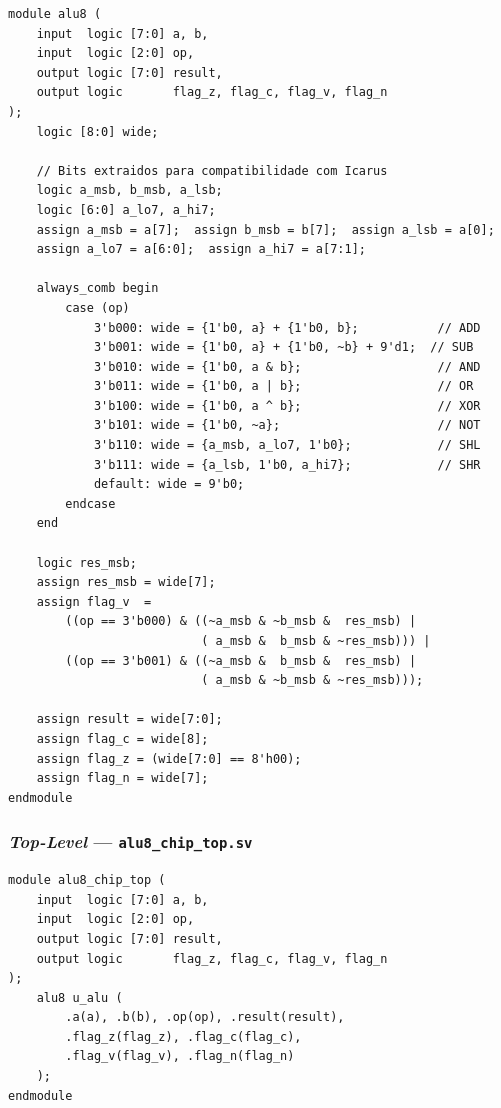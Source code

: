 \documentclass[12pt,a4paper]{article}
\begin{document}
\begin{lstlisting}[style=svstyle,caption={\texttt{alu8.sv} --- N\'{u}cleo combinacional da ULA de 8 bits},label=lst:alu]
module alu8 (
    input  logic [7:0] a, b,
    input  logic [2:0] op,
    output logic [7:0] result,
    output logic       flag_z, flag_c, flag_v, flag_n
);
    logic [8:0] wide;

    // Bits extraidos para compatibilidade com Icarus
    logic a_msb, b_msb, a_lsb;
    logic [6:0] a_lo7, a_hi7;
    assign a_msb = a[7];  assign b_msb = b[7];  assign a_lsb = a[0];
    assign a_lo7 = a[6:0];  assign a_hi7 = a[7:1];

    always_comb begin
        case (op)
            3'b000: wide = {1'b0, a} + {1'b0, b};           // ADD
            3'b001: wide = {1'b0, a} + {1'b0, ~b} + 9'd1;  // SUB
            3'b010: wide = {1'b0, a & b};                   // AND
            3'b011: wide = {1'b0, a | b};                   // OR
            3'b100: wide = {1'b0, a ^ b};                   // XOR
            3'b101: wide = {1'b0, ~a};                      // NOT
            3'b110: wide = {a_msb, a_lo7, 1'b0};            // SHL
            3'b111: wide = {a_lsb, 1'b0, a_hi7};            // SHR
            default: wide = 9'b0;
        endcase
    end

    logic res_msb;
    assign res_msb = wide[7];
    assign flag_v  =
        ((op == 3'b000) & ((~a_msb & ~b_msb &  res_msb) |
                           ( a_msb &  b_msb & ~res_msb))) |
        ((op == 3'b001) & ((~a_msb &  b_msb &  res_msb) |
                           ( a_msb & ~b_msb & ~res_msb)));

    assign result = wide[7:0];
    assign flag_c = wide[8];
    assign flag_z = (wide[7:0] == 8'h00);
    assign flag_n = wide[7];
endmodule
\end{lstlisting}

\subsubsection{\textit{Top-Level} --- \texttt{alu8\_chip\_top.sv}}

\begin{lstlisting}[style=svstyle,caption={\texttt{alu8\_chip\_top.sv} --- Integra\c{c}\~{a}o dos blocos},label=lst:top]
module alu8_chip_top (
    input  logic [7:0] a, b,
    input  logic [2:0] op,
    output logic [7:0] result,
    output logic       flag_z, flag_c, flag_v, flag_n
);
    alu8 u_alu (
        .a(a), .b(b), .op(op), .result(result),
        .flag_z(flag_z), .flag_c(flag_c),
        .flag_v(flag_v), .flag_n(flag_n)
    );
endmodule
\end{lstlisting}
\end{document}
